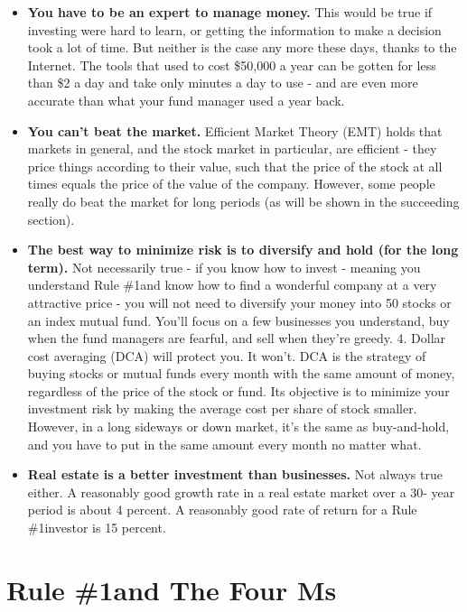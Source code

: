 \documentclass[a4paper]{jpconf}
\newcommand{\ruleone}{Rule \#1\space}
\begin{document}
\begin{itemize}
\item {\bf You have to be an expert to manage money.} This would be
  true if investing were hard to learn, or getting the information to
  make a decision took a lot of time. But neither is the case any more
  these days, thanks to the Internet. The tools that used to cost
  \$50,000 a year can be gotten for less than \$2 a day and take only
  minutes a day to use - and are even more accurate than what your
  fund manager used a year back.

\item {\bf You can't beat the market.} Efficient Market Theory (EMT)
  holds that markets in general, and the stock market in particular,
  are efficient - they price things according to their value, such
  that the price of the stock at all times equals the price of the
  value of the company. However, some people really do beat the market
  for long periods (as will be shown in the succeeding section).

\item {\bf The best way to minimize risk is to diversify and hold (for
    the long term).} Not necessarily true - if you know how to invest
  - meaning you understand \ruleone and know how to find a wonderful
  company at a very attractive price - you will not need to diversify 
  your money into 50 stocks or an index mutual fund. You'll focus on a
  few businesses you understand, buy when the fund managers are
  fearful, and sell when they're greedy.  4. Dollar cost averaging
  (DCA) will protect you. It won't. DCA is the strategy of buying
  stocks or mutual funds every month with the same amount of money,
  regardless of the price of the stock or fund. Its objective is to
  minimize your investment risk by making the average cost per share
  of stock smaller. However, in a long sideways or down market, it's
  the same as buy-and-hold, and you have to put in the same amount
  every month no matter what.

\item {\bf Real estate is a better investment than businesses.}  Not
  always true either. A reasonably good growth rate in a real estate
  market over a 30- year period is about 4 percent. A reasonably good
  rate of return for a \ruleone investor is 15 percent.

\end{itemize}

\section{\ruleone and The Four Ms}
\end{document}
